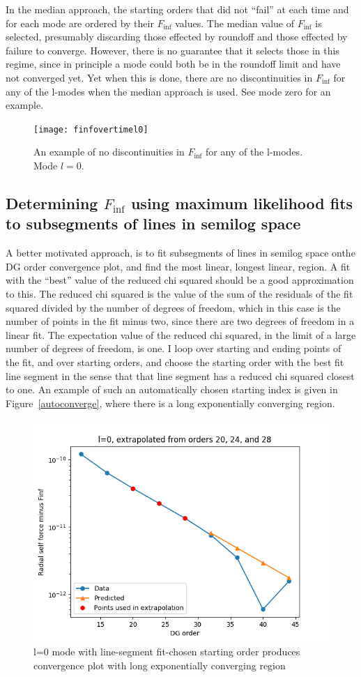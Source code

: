 In the median approach, the starting orders that did not ``fail'' at each time and for each mode are ordered by their $F_{\inf}$ values. The median value of $F_{\inf}$ is selected, presumably discarding those effected by roundoff and those effected by failure to converge. However, there is no guarantee that it selects those in this regime, since in principle a mode could both be in the roundoff limit and have not converged yet. Yet when this is done, there are no discontinuities in $F_{\inf}$ for any of the l-modes when the median approach is used. See mode zero for an example.

\begin{figure}
  \texttt{[image: finfovertimel0]}
  \caption{An example of no discontinuities in $F_{\inf}$ for any of the l-modes. Mode $l=0$.}
\end{figure}


\subsection{Determining $F_{\inf}$ using maximum likelihood fits to subsegments of lines in semilog space}
A better motivated approach, is to fit subsegments of lines in semilog space onthe DG order convergence plot, and find the most linear, longest linear, region. A fit with the ``best'' value of the reduced chi squared should be a good approximation to this. The reduced chi squared is the value of the sum of the residuals of the fit squared divided by the number of degrees of freedom, which in this case is the number of points in the fit minus two, since there are two degrees of freedom in a linear fit. The expectation value of the reduced chi squared, in the limit of a large number of degrees of freedom, is one. I loop over starting and ending points of the fit, and over starting orders, and choose the starting order with the best fit line segment in the sense that that line segment has a reduced chi squared closest to one. An example of such an automatically chosen starting index is given in Figure~\ref{autoconverge}, where there is a long exponentially converging region.

\begin{figure}
  \includegraphics{fittingtechniqet370l0}
  \caption{l=0 mode with line-segment fit-chosen starting order produces convergence plot with long exponentially converging region}
\end{figure}





